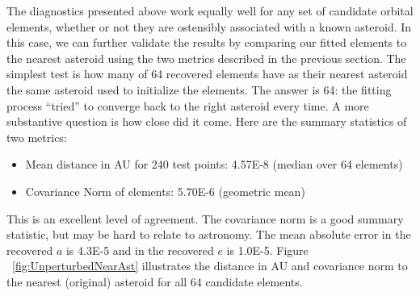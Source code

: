 The diagnostics presented above work equally well for any set of candidate orbital elements,
whether or not they are ostensibly associated with a known asteroid.
In this case, we can further validate the results by comparing our fitted elements to the nearest asteroid
using the two metrics described in the previous section.
The simplest test is how many of 64 recovered elements have as their nearest asteroid the same asteroid used to initialize the elements.
The answer is 64: the fitting process ``tried'' to converge back to the right asteroid every time.
A more substantive question is how close did it come.  
Here are the summary statistics of two metrics:
\begin{itemize}
\item Mean distance in AU for 240 test points: 4.57E-8 (median over 64 elements)
\item Covariance Norm of elements: 5.70E-6 (geometric mean)
\end{itemize}
This is an excellent level of agreement.
The covariance norm is a good summary statistic, but may be hard to relate to astronomy.
The mean absolute error in the recovered $a$ is 4.3E-5 and in the recovered $e$ is 1.0E-5.
Figure ~\ref{fig:UnperturbedNearAst} illustrates the distance in AU and covariance norm to the nearest (original) asteroid for all 64 candidate elements.
